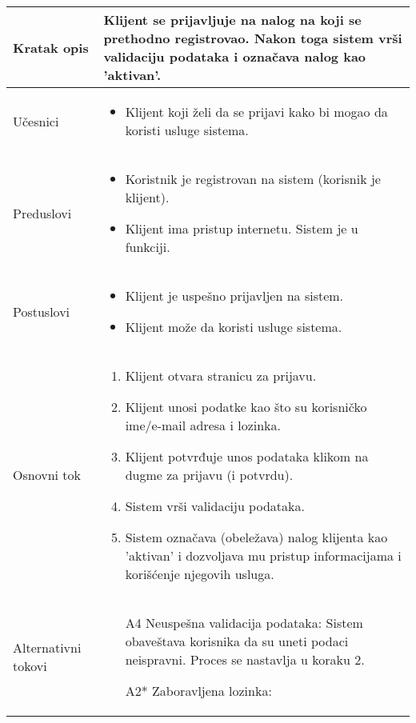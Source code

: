 \documentclass[../main.tex]{subfiles}
\begin{document}
\begin{longtable}{| p{} | p{} |} 
\hline
    Kratak opis & Klijent se prijavljuje na nalog na koji se prethodno registrovao. Nakon toga sistem vrši validaciju podataka i označava nalog kao 'aktivan'.\\
\hline
    Učesnici & \begin{itemize}
        \item Klijent koji želi da se prijavi kako bi mogao da koristi usluge sistema.
    \end{itemize} \\
\hline
   Preduslovi & \begin{itemize}
    \item Koristnik je registrovan na sistem (korisnik je klijent).
    \item Klijent ima pristup internetu. Sistem je u funkciji.
   \end{itemize}
   \\
\hline  
    Postuslovi & \begin{itemize}
        \item Klijent je uspešno prijavljen na sistem.
        \item Klijent može da koristi usluge sistema.
    \end{itemize} \\
\hline
    Osnovni tok & \begin{enumerate}
    \item Klijent otvara stranicu za prijavu.
	\item Klijent unosi podatke kao što su korisničko ime/e-mail adresa i lozinka.
	\item Klijent potvrđuje unos podataka klikom na dugme za prijavu (i potvrdu).
	\item Sistem vrši validaciju podataka.
	\item Sistem označava (obeležava) nalog klijenta kao 'aktivan' i dozvoljava mu pristup informacijama i korišćenje njegovih usluga.
	\end{enumerate}\\
\hline
    Alternativni tokovi & \begin{itemize}
    \item [A4] Neuspešna validacija podataka: Sistem obaveštava korisnika da su uneti podaci neispravni. Proces se nastavlja u koraku 2.
    \item [A2*] Zaboravljena lozinka: \begin{enumerate}

\end{enumerate}
\end{itemize}
\end{longtable}
\end{document}
